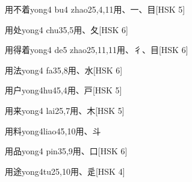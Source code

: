 \begin{EntryWithPhonetic}{用不着}{yong4 bu4 zhao2}{5,4,11}{⽤、⼀、⽬}[HSK 5]
\end{EntryWithPhonetic}

\begin{EntryWithPhonetic}{用处}{yong4 chu3}{5,5}{⽤、⼡}[HSK 6]
\end{EntryWithPhonetic}

\begin{EntryWithPhonetic}{用得着}{yong4 de5 zhao2}{5,11,11}{⽤、⼻、⽬}[HSK 6]
\end{EntryWithPhonetic}

\begin{EntryWithPhonetic}{用法}{yong4 fa3}{5,8}{⽤、⽔}[HSK 6]
\end{EntryWithPhonetic}

\begin{EntryWithPhonetic}{用户}{yong4hu4}{5,4}{⽤、⼾}[HSK 5]
\end{EntryWithPhonetic}

\begin{EntryWithPhonetic}{用来}{yong4 lai2}{5,7}{⽤、⽊}[HSK 5]
\end{EntryWithPhonetic}

\begin{EntryWithPhonetic}{用料}{yong4liao4}{5,10}{⽤、⽃}
\end{EntryWithPhonetic}

\begin{EntryWithPhonetic}{用品}{yong4 pin3}{5,9}{⽤、⼝}[HSK 6]
\end{EntryWithPhonetic}

\begin{EntryWithPhonetic}{用途}{yong4tu2}{5,10}{⽤、⾡}[HSK 4]
\end{EntryWithPhonetic}

